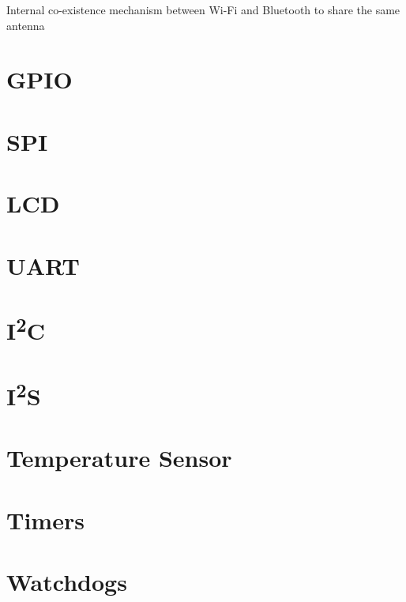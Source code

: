 Internal co-existence mechanism between Wi-Fi and Bluetooth to share the same antenna



\section{GPIO}

\section{SPI}

\section{LCD}

\section{UART}

\section{I\textsuperscript{2}C}

\section{I\textsuperscript{2}S}

\section{Temperature Sensor}

\section{Timers}

\section{Watchdogs}



